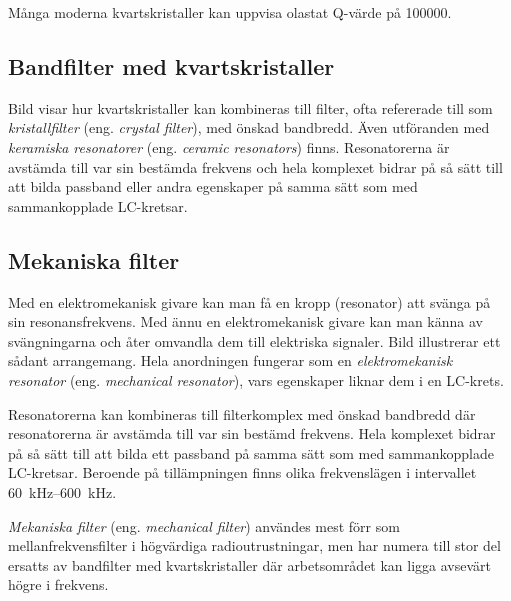 Många moderna kvartskristaller kan uppvisa olastat Q-värde på 100000.

\vspace{12pt} %

\subsection{Bandfilter med kvartskristaller}
\label{bandfilter_kristall}


Bild  visar hur kvartskristaller kan kombineras till
filter, ofta refererade till som \emph{kristallfilter} (eng.
\emph{crystal filter}), med önskad bandbredd.
Även utföranden med \emph{keramiska resonatorer} (eng.
\emph{ceramic resonators}) finns.
Resonatorerna är avstämda till var sin bestämda frekvens och hela komplexet
bidrar på så sätt till att bilda passband eller andra egenskaper på samma sätt
som med sammankopplade LC-kretsar.

\subsection{Mekaniska filter}

Med en elektromekanisk givare kan man få en kropp (resonator) att svänga på sin
resonansfrekvens.
Med ännu en elektromekanisk givare kan man känna av svängningarna och
åter omvandla dem till elektriska signaler.
Bild  illustrerar ett sådant arrangemang.
Hela anordningen fungerar som en \emph{elektromekanisk resonator} (eng.
\emph{mechanical resonator}), vars egenskaper liknar dem i en LC-krets.

% 

Resonatorerna kan kombineras till filterkomplex med önskad bandbredd där
resonatorerna är avstämda till var sin bestämd frekvens.
Hela komplexet bidrar på så sätt till att bilda ett passband på samma sätt som
med sammankopplade LC-kretsar.
Beroende på tillämpningen finns olika frekvenslägen i intervallet
\SIrange{60}{600}{\kilo\hertz}.

\emph{Mekaniska filter} (eng. \emph{mechanical filter}) användes mest förr som
mellanfrekvensfilter i högvärdiga radioutrustningar, men har numera till stor
del ersatts av bandfilter med kvartskristaller där arbetsområdet kan ligga
avsevärt högre i frekvens.

